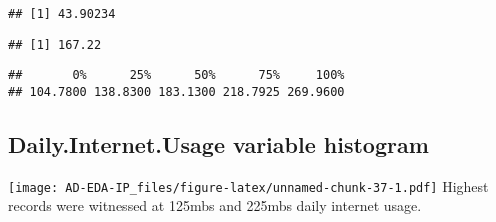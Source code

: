 \documentclass[
]{article}
\newenvironment{Shaded}{\begin{snugshade}}{\end{snugshade}}
\newcommand{\CommentTok}[1]{\textcolor[rgb]{0.56,0.35,0.01}{\textit{#1}}}
\newcommand{\FunctionTok}[1]{\textcolor[rgb]{0.00,0.00,0.00}{#1}}
\newcommand{\NormalTok}[1]{#1}
\newcommand{\OtherTok}[1]{\textcolor[rgb]{0.56,0.35,0.01}{#1}}
\newcommand{\SpecialCharTok}[1]{\textcolor[rgb]{0.00,0.00,0.00}{#1}}
\begin{document}
\begin{verbatim}
## [1] 43.90234
\end{verbatim}

\begin{Shaded}
\end{Shaded}

\begin{verbatim}
## [1] 167.22
\end{verbatim}

\begin{Shaded}
\end{Shaded}

\begin{verbatim}
##       0%      25%      50%      75%     100% 
## 104.7800 138.8300 183.1300 218.7925 269.9600
\end{verbatim}

\hypertarget{daily.internet.usage-variable-histogram}{%
\subsection{Daily.Internet.Usage variable
histogram}\label{daily.internet.usage-variable-histogram}}

\begin{Shaded}
\end{Shaded}

\texttt{[image: AD-EDA-IP\_files/figure-latex/unnamed-chunk-37-1.pdf]}
Highest records were witnessed at 125mbs and 225mbs daily internet
usage.
\end{document}

